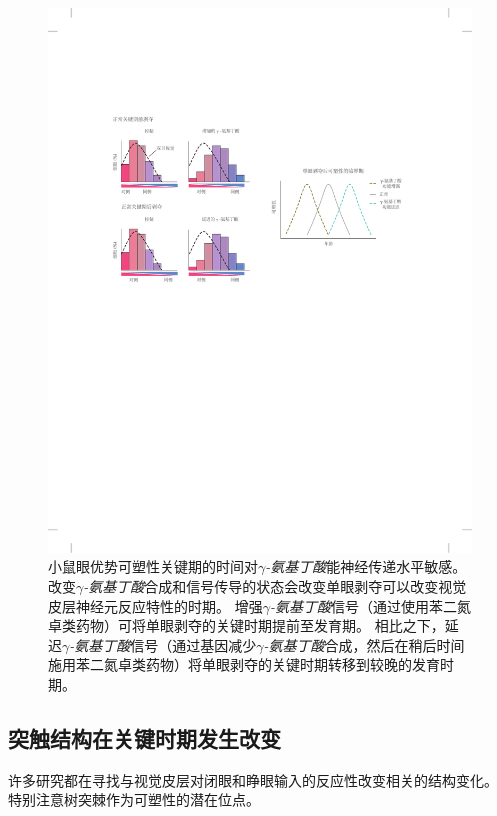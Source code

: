 \begin{figure}[htbp]
	\centering
	\includegraphics[width=1.0\linewidth]{chap49/fig_49_9}
	\caption{小鼠眼优势可塑性关键期的时间对\textit{$\gamma$-氨基丁酸}能神经传递水平敏感。
		改变\textit{$\gamma$-氨基丁酸}合成和信号传导的状态会改变单眼剥夺可以改变视觉皮层神经元反应特性的时期。
		增强\textit{$\gamma$-氨基丁酸}信号（通过使用苯二氮卓类药物）可将单眼剥夺的关键时期提前至发育期。
		相比之下，延迟\textit{$\gamma$-氨基丁酸}信号（通过基因减少\textit{$\gamma$-氨基丁酸}合成，然后在稍后时间施用苯二氮卓类药物）将单眼剥夺的关键时期转移到较晚的发育时期\cite{daw1998critical}。}
	\label{fig:49_9}
\end{figure}



\subsection{突触结构在关键时期发生改变}

许多研究都在寻找与视觉皮层对闭眼和睁眼输入的反应性改变相关的结构变化。
特别注意树突棘作为可塑性的潜在位点。


